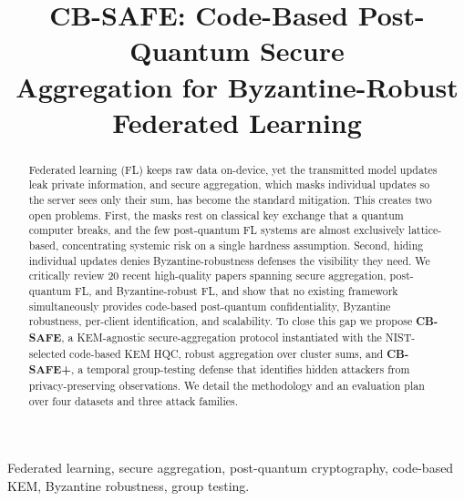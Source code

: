 \documentclass[conference]{IEEEtran}
\begin{document}
\title{CB-SAFE: Code-Based Post-Quantum Secure\\Aggregation for Byzantine-Robust Federated Learning}

\author{%
\and
{}
}

\maketitle

\begin{abstract}
Federated learning (FL) keeps raw data on-device, yet the transmitted model
updates leak private information, and secure aggregation, which masks individual
updates so the server sees only their sum, has become the standard mitigation.
This creates two open problems. First, the masks rest on classical key exchange
that a quantum computer breaks, and the few post-quantum FL systems are almost
exclusively lattice-based, concentrating systemic risk on a single hardness
assumption. Second, hiding individual updates denies Byzantine-robustness
defenses the visibility they need. We critically review 20 recent high-quality
papers spanning secure aggregation, post-quantum FL, and Byzantine-robust FL, and
show that no existing framework simultaneously provides code-based post-quantum
confidentiality, Byzantine robustness, per-client identification, and scalability.
To close this gap we propose \textbf{CB-SAFE}, a KEM-agnostic secure-aggregation
protocol instantiated with the NIST-selected code-based KEM HQC, robust aggregation
over cluster sums, and \textbf{CB-SAFE+}, a temporal group-testing defense that
identifies hidden attackers from privacy-preserving observations. We detail the
methodology and an evaluation plan over four datasets and three attack families.
\end{abstract}

\begin{IEEEkeywords}
Federated learning, secure aggregation, post-quantum cryptography, code-based KEM,
Byzantine robustness, group testing.
\end{IEEEkeywords}
\end{document}
